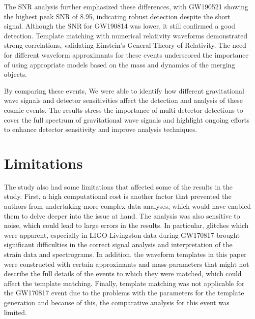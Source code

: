 The SNR analysis further emphasized these differences, with GW190521 showing the highest peak SNR of 8.95, indicating robust detection despite the short signal. Although the SNR for GW190814 was lower, it still confirmed a good detection. Template matching with numerical relativity waveforms demonstrated strong correlations, validating Einstein's General Theory of Relativity. The need for different waveform approximants for these events underscored the importance of using appropriate models based on the mass and dynamics of the merging objects.

By comparing these events, We were able to identify how different gravitational wave signals and detector sensitivities affect the detection and analysis of these cosmic events. The results stress the importance of multi-detector detections to cover the full spectrum of gravitational wave signals and highlight ongoing efforts to enhance detector sensitivity and improve analysis techniques.

\section{Limitations}
The study also had some limitations that affected some of the results in the study. First, a high computational cost is another factor that prevented the authors from undertaking more complex data analyses, which would have enabled them to delve deeper into the issue at hand. The analysis was also sensitive to noise, which could lead to large errors in the results. In particular, glitches which were apparent, especially in LIGO-Livingston data during GW170817 brought significant difficulties in the correct signal analysis and interpretation of the strain data and spectrograms. In addition, the waveform templates in this paper were constructed with certain approximants and mass parameters that might not describe the full details of the events to which they were matched, which could affect the template matching. Finally, template matching was not applicable for the GW170817 event due to the problems with the parameters for the template generation and because of this, the comparative analysis for this event was limited.


